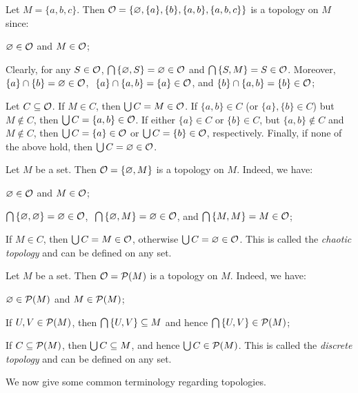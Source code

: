 \be
Let $M = \{a,b,c\}$. Then $\mathcal{O}=\{\varnothing,\{a\},\{b\},\{a,b\},\{a,b,c\}\}$ is a topology on $M$ since:
\ben
\item[i)] $\varnothing \in \mathcal{O}$ and $M \in \mathcal{O}$;
\item[ii)] Clearly, for any $S \in \mathcal{O}$, $\bigcap\,\{\varnothing,S\}=\varnothing\in\mathcal{O}$ and $\bigcap\,\{S,M\}=S\in\mathcal{O}$. Moreover, $\{a\}\cap\{b\}=\varnothing\in\mathcal{O}$, $\ \{a\}\cap\{a,b\} =\{a\}\in \mathcal{O}$, and $\{b\}\cap\{a,b\} =\{b\}\in \mathcal{O}$;
\item[iii)] Let $C\subseteq\mathcal{O}$. If $M \in C$, then $\bigcup C = M\in \mathcal{O}$. If $\{a,b\} \in C$ (or $\{a\},\{b\}\in C$) but $M \notin C$, then $\bigcup C = \{a,b\}\in \mathcal{O}$. If either $\{a\}\in C$ or $\{b\}\in C$, but $\{a,b\} \notin C$ and $M \notin C$, then $\bigcup C = \{a\}\in \mathcal{O}$ or $\bigcup C = \{b\}\in \mathcal{O}$, respectively. Finally, if none of the above hold, then $\bigcup C = \varnothing \in \mathcal{O}$.
\een
\ee

\be
Let $M$ be a set. Then $\mathcal{O}=\{\varnothing , M\}$ is a topology on $M$. Indeed, we have:
\ben
\item[i)] $\varnothing \in \mathcal{O}$ and $M \in \mathcal{O}$;
\item[ii)] $\bigcap\, \{\varnothing,\varnothing\} = \varnothing \in \mathcal{O}$, $\ \bigcap\, \{\varnothing,M\} = \varnothing \in \mathcal{O}$, and $\bigcap\, \{M,M\} = M \in \mathcal{O}$;
\item[iii)] If $M \in C$, then $\bigcup C = M \in \mathcal{O}$, otherwise $\bigcup C = \varnothing \in \mathcal{O}$.
\een
This is called the \emph{chaotic topology} and can be defined on any set.
\ee

\be
Let $M$ be a set. Then $\mathcal{O}=\mathcal{P}(M)$ is a topology on $M$. Indeed, we have:
\ben
\item[i)] $\varnothing \in \mathcal{P}(M)$ and $M \in \mathcal{P}(M)$;
\item[ii)] If $U,V \in \mathcal{P}(M)$, then $\bigcap\, \{U,V\} \subseteq M$ and hence $\bigcap\, \{U,V\} \in \mathcal{P}(M)$;
\item[iii)] If $C\subseteq\mathcal{P}(M)$, then $\bigcup C \subseteq M$, and hence $\bigcup C \in \mathcal{P}(M)$.
\een
This is called the \emph{discrete topology} and can be defined on any set.
\ee




We now give some common terminology regarding topologies.

